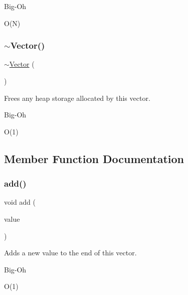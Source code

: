 \begin{DoxyRefDesc}{Big-\/\+Oh}
\item[\mbox{\hyperlink{BigOh__BigOh000102}{Big-\/\+Oh}}]O(\+N) \end{DoxyRefDesc}
\mbox{\label{classVector_aaa9fccd0cb7734271f7a15e5d9dc0d27}} 
\subsubsection{\texorpdfstring{$\sim$\+Vector()}{~Vector()}}
{\footnotesize\ttfamily $\sim$\mbox{\hyperlink{classVector}{Vector}} (\begin{DoxyParamCaption}{ }\end{DoxyParamCaption})\hspace{0.3cm}{\ttfamily [virtual]}}



Frees any heap storage allocated by this vector. 

\begin{DoxyRefDesc}{Big-\/\+Oh}
\item[\mbox{\hyperlink{BigOh__BigOh000103}{Big-\/\+Oh}}]O(1) \end{DoxyRefDesc}


\subsection{Member Function Documentation}
\mbox{\label{classVector_ab901606bf3a8019c986f0cf9a9f298dc}} 
\subsubsection{\texorpdfstring{add()}{add()}}
{\footnotesize\ttfamily void add (\begin{DoxyParamCaption}\item[{const Value\+Type \&}]{value }\end{DoxyParamCaption})}



Adds a new value to the end of this vector. 

\begin{DoxyRefDesc}{Big-\/\+Oh}
\item[\mbox{\hyperlink{BigOh__BigOh000104}{Big-\/\+Oh}}]O(1) \end{DoxyRefDesc}
\mbox{\label{classVector_a7e05c14d67a60defeb6723b5704967a6}} 
